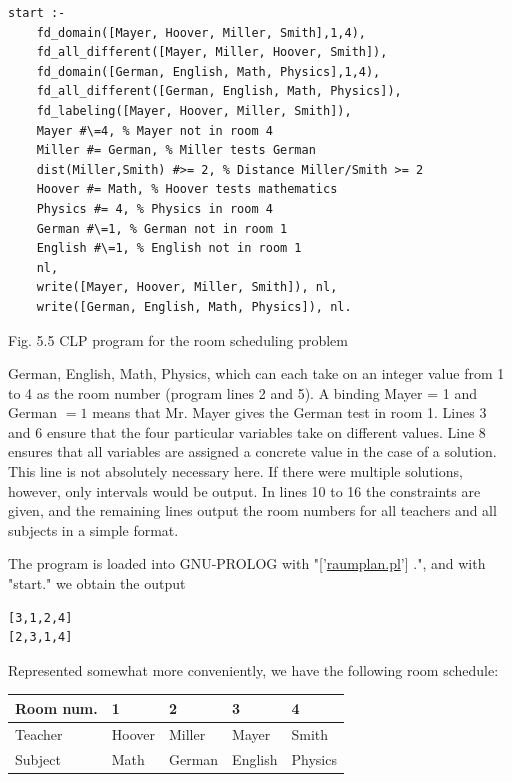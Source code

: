 \documentclass[10pt]{book}
\begin{document}
\begin{center}
\begin{verbatim}
start :-
    fd_domain([Mayer, Hoover, Miller, Smith],1,4),
    fd_all_different([Mayer, Miller, Hoover, Smith]),
    fd_domain([German, English, Math, Physics],1,4),
    fd_all_different([German, English, Math, Physics]),
    fd_labeling([Mayer, Hoover, Miller, Smith]),
    Mayer #\=4, % Mayer not in room 4
    Miller #= German, % Miller tests German
    dist(Miller,Smith) #>= 2, % Distance Miller/Smith >= 2
    Hoover #= Math, % Hoover tests mathematics
    Physics #= 4, % Physics in room 4
    German #\=1, % German not in room 1
    English #\=1, % English not in room 1
    nl,
    write([Mayer, Hoover, Miller, Smith]), nl,
    write([German, English, Math, Physics]), nl.
\end{verbatim}

Fig. 5.5 CLP program for the room scheduling problem

German, English, Math, Physics, which can each take on an integer value from 1 to 4 as the room number (program lines 2 and 5). A binding Mayer = 1 and German $=1$ means that Mr. Mayer gives the German test in room 1. Lines 3 and 6 ensure that the four particular variables take on different values. Line 8 ensures that all variables are assigned a concrete value in the case of a solution. This line is not absolutely necessary here. If there were multiple solutions, however, only intervals would be output. In lines 10 to 16 the constraints are given, and the remaining lines output the room numbers for all teachers and all subjects in a simple format.

The program is loaded into GNU-PROLOG with "['\href{http://raumplan.pl}{raumplan.pl}'] .", and with "start." we obtain the output

\begin{verbatim}
[3,1,2,4]
[2,3,1,4]
\end{verbatim}

Represented somewhat more conveniently, we have the following room schedule:

\begin{center}
\begin{tabular}{lllll}
\hline
Room num. & 1 & 2 & 3 & 4 \\
\hline
Teacher & Hoover & Miller & Mayer & Smith \\
\hline
Subject & Math & German & English & Physics \\
\hline
\end{tabular}
\end{center}


\end{center}
\end{document}
